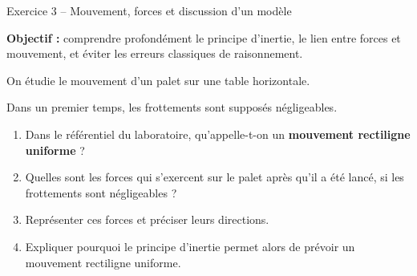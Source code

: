 \documentclass[11pt,a4paper]{article}
\begin{document}
\begin{exobox}{Exercice 3 -- Mouvement, forces et discussion d’un modèle}
\begin{objectifbox}
\textbf{Objectif :} comprendre profondément le principe d’inertie, le lien entre forces et mouvement, et éviter les erreurs classiques de raisonnement.
\end{objectifbox}

On étudie le mouvement d’un palet sur une table horizontale.

\begin{center}
\end{center}

Dans un premier temps, les frottements sont supposés négligeables.

\begin{enumerate}[label=\textbf{\arabic*.}]
    \item Dans le référentiel du laboratoire, qu’appelle-t-on un \textbf{mouvement rectiligne uniforme} ?

    \item Quelles sont les forces qui s’exercent sur le palet après qu’il a été lancé, si les frottements sont négligeables ?

    \item Représenter ces forces et préciser leurs directions.

    \item Expliquer pourquoi le principe d’inertie permet alors de prévoir un mouvement rectiligne uniforme.


\end{enumerate}
\end{exobox}
\end{document}
